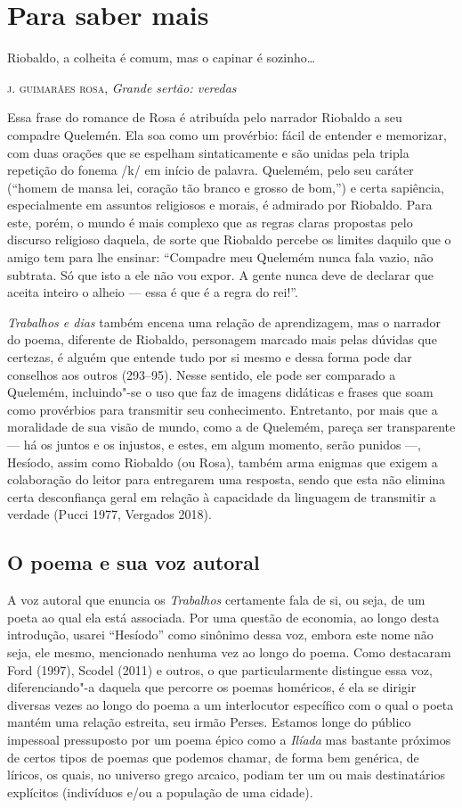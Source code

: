 \chapter{Para saber mais}

\epigraph{Riobaldo, a colheita é comum,
mas o capinar é sozinho\ldots{}}{\textsc{j. guimarães rosa}, \textit{Grande sertão: veredas}}


Essa frase do romance de Rosa é atribuída pelo narrador Riobaldo a seu
compadre Quelemén. Ela soa como um provérbio: fácil de entender e
memorizar, com duas orações que se espelham sintaticamente e são unidas
pela tripla repetição do fonema /k/ em início de palavra. Quelemém, pelo
seu caráter (``homem de mansa lei, coração tão branco e grosso de
bom,'') e certa sapiência, especialmente em assuntos religiosos e
morais, é admirado por Riobaldo. Para este, porém, o mundo é mais
complexo que as regras claras propostas pelo discurso religioso daquela,
de sorte que Riobaldo percebe os limites daquilo que o amigo tem para
lhe ensinar: ``Compadre meu Quelemém nunca fala vazio, não subtrata. Só
que isto a ele não vou expor. A gente nunca deve de declarar que aceita
inteiro o alheio --- essa é que é a regra do rei!''.

\emph{Trabalhos e dias} também encena uma relação de aprendizagem, mas o
narrador do poema, diferente de Riobaldo, personagem marcado mais pelas
dúvidas que certezas, é alguém que entende tudo por si mesmo e dessa
forma pode dar conselhos aos outros (293--95). Nesse sentido, ele pode
ser comparado a Quelemém, incluindo"-se o uso que faz de imagens
didáticas e frases que soam como provérbios para transmitir seu
conhecimento. Entretanto, por mais que a moralidade de sua visão de
mundo, como a de Quelemém, pareça ser transparente --- há os juntos e os
injustos, e estes, em algum momento, serão punidos ---, Hesíodo, assim
como Riobaldo (ou Rosa), também arma enigmas que exigem a colaboração do
leitor para entregarem uma resposta, sendo que esta não elimina certa
desconfiança geral em relação à capacidade da linguagem de transmitir a
verdade (Pucci 1977, Vergados 2018).

\section{O poema e sua voz autoral}


A voz autoral que enuncia os \emph{Trabalhos} certamente fala de si, ou
seja, de um poeta ao qual ela está associada. Por uma questão de
economia, ao longo desta introdução, usarei ``Hesíodo'' como sinônimo
dessa voz, embora este nome não seja, ele mesmo, mencionado nenhuma vez
ao longo do poema. Como destacaram Ford (1997), Scodel (2011) e outros,
o que particularmente distingue essa voz, diferenciando"-a daquela que
percorre os poemas homéricos, é ela se dirigir diversas vezes ao longo
do poema a um interlocutor específico com o qual o poeta mantém uma
relação estreita, seu irmão Perses. Estamos longe do público impessoal
pressuposto por um poema épico como a \emph{Ilíada} mas bastante
próximos de certos tipos de poemas que podemos chamar, de forma bem
genérica, de líricos, os quais, no universo grego arcaico, podiam ter um
ou mais destinatários explícitos (indivíduos e/ou a população de uma
cidade).

